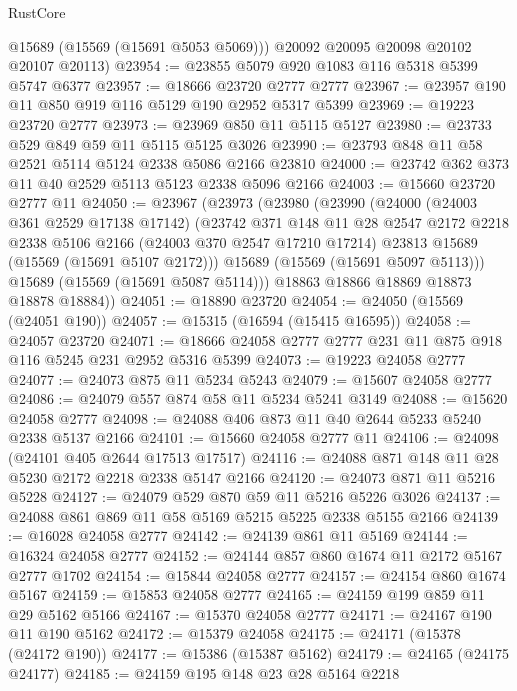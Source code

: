 \begin{lexlean}{RustCore}
\begin{coremodule}
        @15689
        (@15569 (@15691 @5053 @5069)))
      @20092
      @20095
      @20098
      @20102
      @20107
      @20113)
@23954 := @23855 @5079 @920 @1083 @116 @5318 @5399 @5747 @6377
@23957 := @18666 @23720 @2777 @2777
@23967 := @23957 @190 @11 @850 @919 @116 @5129 @190 @2952 @5317 @5399
@23969 := @19223 @23720 @2777
@23973 := @23969 @850 @11 @5115 @5127
@23980 := @23733 @529 @849 @59 @11 @5115 @5125 @3026
@23990 := @23793 @848 @11 @58 @2521 @5114 @5124 @2338 @5086 @2166 @23810
@24000 := @23742 @362 @373 @11 @40 @2529 @5113 @5123 @2338 @5096 @2166
@24003 := @15660 @23720 @2777 @11
@24050 := @23967
    (@23973
      (@23980
        (@23990
          (@24000
            (@24003 @361 @2529 @17138 @17142)
            (@23742
              @371
              @148
              @11
              @28
              @2547
              @2172
              @2218
              @2338
              @5106
              @2166
              (@24003 @370 @2547 @17210 @17214)
              @23813
              @15689
              (@15569 (@15691 @5107 @2172)))
            @15689
            (@15569 (@15691 @5097 @5113)))
          @15689
          (@15569 (@15691 @5087 @5114)))
        @18863
        @18866
        @18869
        @18873
        @18878
        @18884))
@24051 := @18890 @23720
@24054 := @24050 (@15569 (@24051 @190))
@24057 := @15315 (@16594 (@15415 @16595))
@24058 := @24057 @23720
@24071 := @18666 @24058 @2777 @2777 @231 @11 @875 @918 @116 @5245 @231 @2952 @5316 @5399
@24073 := @19223 @24058 @2777
@24077 := @24073 @875 @11 @5234 @5243
@24079 := @15607 @24058 @2777
@24086 := @24079 @557 @874 @58 @11 @5234 @5241 @3149
@24088 := @15620 @24058 @2777
@24098 := @24088 @406 @873 @11 @40 @2644 @5233 @5240 @2338 @5137 @2166
@24101 := @15660 @24058 @2777 @11
@24106 := @24098 (@24101 @405 @2644 @17513 @17517)
@24116 := @24088 @871 @148 @11 @28 @5230 @2172 @2218 @2338 @5147 @2166
@24120 := @24073 @871 @11 @5216 @5228
@24127 := @24079 @529 @870 @59 @11 @5216 @5226 @3026
@24137 := @24088 @861 @869 @11 @58 @5169 @5215 @5225 @2338 @5155 @2166
@24139 := @16028 @24058 @2777
@24142 := @24139 @861 @11 @5169
@24144 := @16324 @24058 @2777
@24152 := @24144 @857 @860 @1674 @11 @2172 @5167 @2777 @1702
@24154 := @15844 @24058 @2777
@24157 := @24154 @860 @1674 @5167
@24159 := @15853 @24058 @2777
@24165 := @24159 @199 @859 @11 @29 @5162 @5166
@24167 := @15370 @24058 @2777
@24171 := @24167 @190 @11 @190 @5162
@24172 := @15379 @24058
@24175 := @24171 (@15378 (@24172 @190))
@24177 := @15386 (@15387 @5162)
@24179 := @24165 (@24175 @24177)
@24185 := @24159 @195 @148 @23 @28 @5164 @2218

\end{coremodule}
\end{lexlean}
